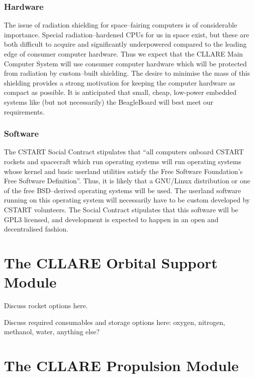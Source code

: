 \documentclass{report}
\begin{document}
\subsubsection{Hardware}

The issue of radiation shielding for space--fairing computers is of considerable importance.  Special radiation--hardened CPUs for us in space exist, but these are both difficult to acquire and significantly underpowered compared to the leading edge of consumer computer hardware.  Thus we expect that the CLLARE Main Computer System will use consumer computer hardware which will be protected from radiation by custom--built shielding.  The desire to minimise the mass of this shielding provides a strong motivation for keeping the computer hardware as compact as possible.  It is anticipated that small, cheap, low-power embedded systems like (but not necessarily) the BeagleBoard will best meet our requirements.

\subsubsection{Software}

The CSTART Social Contract stipulates that ``all computers onboard CSTART rockets and spacecraft which run operating systems will run operating systems whose kernel and basic userland utilities satisfy the Free Software Foundation's Free Software Definition''.  Thus, it is likely that a GNU/Linux distribution or one of the free BSD--derived operating systems will be used.  The userland software running on this operating system will necessarily have to be custom developed by CSTART volunteers.  The Social Contract stipulates that this software will be GPL3 licensed, and development is expected to happen in an open and decentralised fashion.

\section{The CLLARE Orbital Support Module}

Discuss rocket options here.

Discuss required consumables and storage options here: oxygen, nitrogen, methanol, water, anything else?


\section{The CLLARE Propulsion Module}
\end{document}
